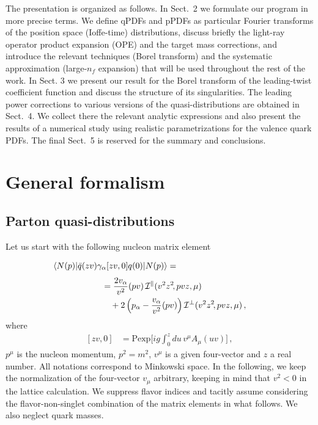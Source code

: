 \documentclass[aps,prd,twocolumn,a4paper,superscriptaddress,10pt,showpacs,notitlepage,floatfix]{revtex4-1}
\begin{document}
    

The presentation is organized as follows. In Sect.~2 we formulate
our program in more precise terms. We define qPDFs and  pPDFs as 
particular Fourier transforms of the position space (Ioffe-time) distributions, 
discuss briefly the light-ray operator product expansion (OPE) and the target mass corrections, and  
introduce the relevant techniques (Borel transform) and the systematic approximation
(large-$n_f$ expansion) that will be used throughout the rest of
the work. In Sect. 3 we present our result for the Borel transform of the leading-twist
coefficient function and discuss the structure of its singularities. 
The leading power corrections to various versions of the quasi-distributions are obtained in Sect.~4. 
We collect there the relevant analytic expressions and also present the results of a numerical 
study using realistic parametrizations for the valence quark PDFs. 
The final Sect.~5 is reserved for the summary and conclusions.   


%
\section{General formalism}\label{sect_formalism}%
%

%
\subsection{Parton quasi-distributions}\label{subsect_definitions}%
%
Let us start with the following nucleon matrix element
\begin{align}
\label{def:ME}
 &\langle N(p)| \bar q (zv) \gamma_\alpha[zv,0] q(0) |N(p)\rangle  = 
\phantom{\frac{2v_\alpha}{v^2} (pv) \mathcal{I}^\parallel (v^2z^2\!,pvz,\mu)}
\notag\\
&\hspace*{2.0cm} = \frac{2v_\alpha}{v^2} (pv)\, \mathcal{I}^\parallel (v^2z^2\!,pvz,\mu)
\notag\\
&\hspace*{2.0cm}\quad+ 2\left(p_\alpha- \frac{v_\alpha}{v^2} (pv) \right) \mathcal{I}^\perp (v^2z^2\!,pvz,\mu)\,,
\end{align}
where
\begin{align}
\label{def:Wilson}
 [zv, 0] &= \text{Pexp}\Big[i g \int_0^z du\,  v^\mu A_\mu(uv)\Big]\,,
\end{align}
$p^\mu$ is the nucleon momentum, $p^2 = m^2$, $v^\mu$ is a given four-vector and $z$ a real number. All notations correspond to Minkowski space. In the following, we keep the normalization of the four-vector $v_\mu$ arbitrary, keeping in mind that $v^2 <0$ in the lattice calculation. We suppress flavor indices and tacitly assume considering the flavor-non-singlet combination of the matrix elements in what follows. We also neglect quark masses. 
\end{document}
